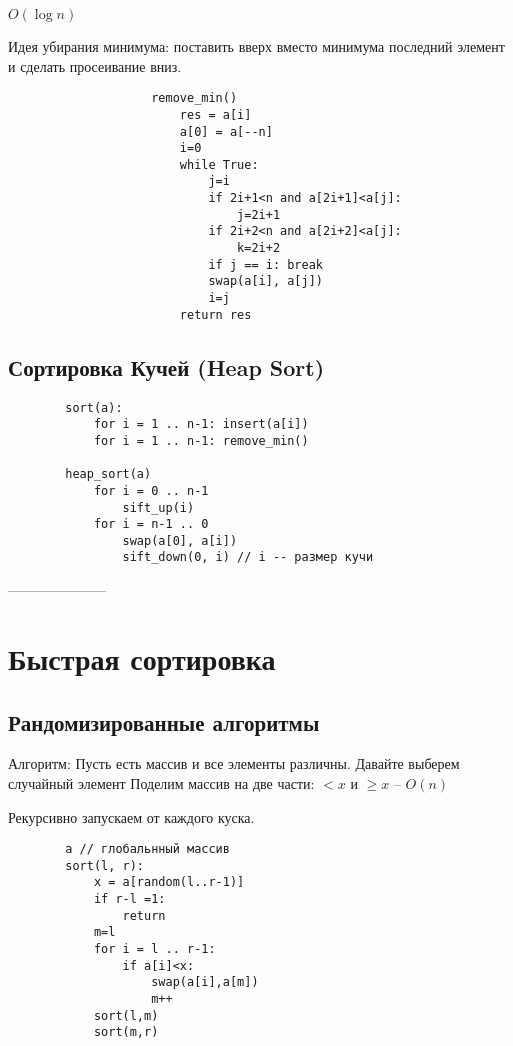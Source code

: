\documentclass{book}
\theoremstyle{definition}
\begin{document}
\begin{enumerate}
                $O(\log n)$

                Идея убирания минимума: поставить вверх вместо минимума последний элемент и сделать просеивание вниз.
\newpage
                \begin{verbatim}
                    remove_min()
                        res = a[i]
                        a[0] = a[--n]
                        i=0
                        while True:
                            j=i
                            if 2i+1<n and a[2i+1]<a[j]:
                                j=2i+1
                            if 2i+2<n and a[2i+2]<a[j]:
                                k=2i+2
                            if j == i: break
                            swap(a[i], a[j])
                            i=j
                        return res
                \end{verbatim}
    \end{enumerate}

    \subsection{Сортировка Кучей (Heap Sort)}
    \begin{verbatim}
        sort(a):
            for i = 1 .. n-1: insert(a[i])
            for i = 1 .. n-1: remove_min()
                
        heap_sort(a)
            for i = 0 .. n-1
                sift_up(i)
            for i = n-1 .. 0
                swap(a[0], a[i])
                sift_down(0, i) // i -- размер кучи
    \end{verbatim}
    ---------------------

    \section{Быстрая сортировка}

    \subsection{Рандомизированные алгоритмы}

    Алгоритм: Пусть есть массив и все элементы различны. Давайте выберем случайный элемент
    Поделим массив на две части: $<x$ и $\geqslant x$ -- $O(n)$

    Рекурсивно запускаем от каждого куска.

    \begin{verbatim}
        a // глобальнный массив
        sort(l, r):
            x = a[random(l..r-1)]
            if r-l =1:
                return
            m=l
            for i = l .. r-1:
                if a[i]<x:
                    swap(a[i],a[m])
                    m++
            sort(l,m)
            sort(m,r)
    \end{verbatim}
\end{document}
